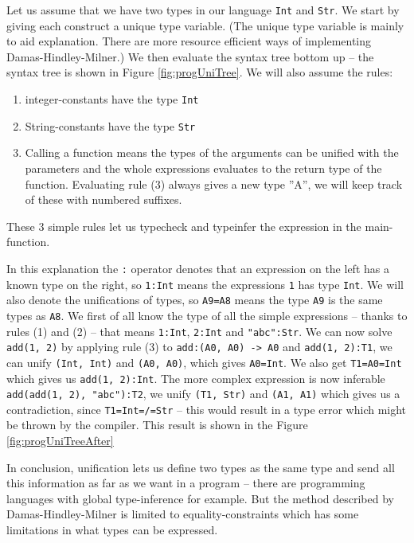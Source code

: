 Let us assume that we have two types in our language \verb+Int+ and \verb+Str+. We start by giving each construct a unique type variable. (The unique type variable is mainly to aid explanation. There are more resource efficient ways of implementing Damas-Hindley-Milner.) We then evaluate the syntax tree bottom up -- the syntax tree is shown in Figure \ref{fig:progUniTree}. We will also assume the rules: 
\begin{enumerate}
  \item integer-constants have the type \verb+Int+
  \item String-constants have the type \verb+Str+
  \item Calling a function means the types of the arguments can be unified with the parameters and the whole expressions evaluates to the return type of the function. Evaluating rule (3) always gives a new type ''A'', we will keep track of these with numbered suffixes.
\end{enumerate}
These 3 simple rules let us typecheck and typeinfer the expression in the main-function.

In this explanation the \verb+:+ operator denotes that an expression on the left has a known type on the right, so \verb+1:Int+ means the expressions \verb+1+ has type \verb+Int+. We will also denote the unifications of types, so \verb+A9=A8+ means the type \verb+A9+ is the same types as \verb+A8+. We first of all know the type of all the simple expressions -- thanks to rules (1) and (2) -- that means \verb+1:Int+, \verb+2:Int+ and \verb+"abc":Str+. We can now solve \verb+add(1, 2)+ by applying rule (3) to \verb+add:(A0, A0) -> A0+ and \verb+add(1, 2):T1+, we can unify \verb+(Int, Int)+ and \verb+(A0, A0)+, which gives \verb+A0=Int+. We also get \verb+T1=A0=Int+ which gives us \verb+add(1, 2):Int+. The more complex expression is now inferable \verb+add(add(1, 2), "abc"):T2+, we unify \verb+(T1, Str)+ and \verb+(A1, A1)+ which gives us a contradiction, since \verb+T1=Int=/=Str+ -- this would result in a type error which might be thrown by the compiler. This result is shown in the Figure \ref{fig:progUniTreeAfter}

In conclusion, unification lets us define two types as the same type and send all this information as far as we want in a program -- there are programming languages with global type-inference for example. But the method described by Damas-Hindley-Milner is limited to equality-constraints which has some limitations in what types can be expressed.

